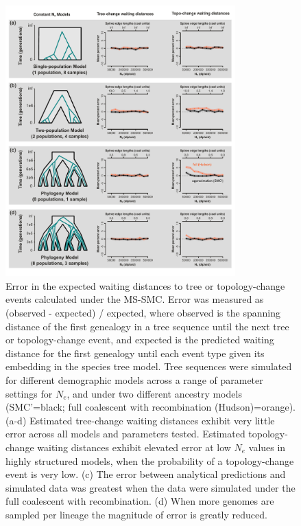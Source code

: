 \documentclass[11pt]{article}
\begin{document}
\begin{figure}[p]
	\centering
	\includegraphics[width=0.79\textwidth]{figures/current/FigSY-smc-approx-bias.pdf}	
	\caption{
		Error in the expected waiting distances to tree or topology-change events 
		calculated under the MS-SMC.
		Error was measured as (observed - expected) / expected, where observed is the 
		spanning distance of the first genealogy in a tree sequence until the next 
		tree or topology-change event, and expected is the predicted waiting distance
		for the first genealogy until each event type given its embedding in the 
		species tree model.
		Tree sequences were simulated for different demographic models across a range 
		of parameter settings for $N_e$, and under two different ancestry models
		(SMC'=black; full coalescent with recombination (Hudson)=orange).
		(a-d) Estimated tree-change waiting distances exhibit very little error across
		all models and parameters tested. Estimated topology-change waiting distances
		exhibit elevated error at low $N_e$ values in highly structured models, when
		the probability of a topology-change event is very low.
		(c) The error between analytical predictions and simulated data was greatest 
		when the data were simulated under the full coalescent with recombination. 
		(d) When more genomes are sampled per lineage the magnitude of error is greatly
		reduced.
	}
	\label{fig:figS-bias-smc}
\end{figure}
\end{document}
